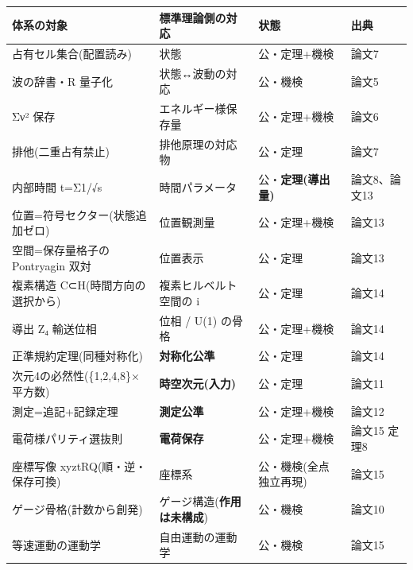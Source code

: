 \documentclass[
]{ltjsarticle}
\newcounter{none} %
\begin{document}
{\def\LTcaptype{none} %
\begin{longtable}[]{@{}
  >{\raggedright\arraybackslash}p{}
  >{\raggedright\arraybackslash}p{}
  >{\raggedright\arraybackslash}p{}
  >{\raggedright\arraybackslash}p{}@{}}
\toprule\noalign{}
\begin{minipage}[b]{\linewidth}\raggedright
体系の対象
\end{minipage} & \begin{minipage}[b]{\linewidth}\raggedright
標準理論側の対応
\end{minipage} & \begin{minipage}[b]{\linewidth}\raggedright
状態
\end{minipage} & \begin{minipage}[b]{\linewidth}\raggedright
出典
\end{minipage} \\
\midrule\noalign{}
\endhead
\bottomrule\noalign{}
\endlastfoot
占有セル集合(配置読み) & 状態 & 公・定理+機検 & 論文7 \\
波の辞書・R 量子化 & 状態↔波動の対応 & 公・機検 & 論文5 \\
Σν² 保存 & エネルギー様保存量 & 公・定理+機検 & 論文6 \\
排他(二重占有禁止) & 排他原理の対応物 & 公・定理 & 論文7 \\
内部時間 t=Σ1/√s & 時間パラメータ & 公・\textbf{定理(導出量)} &
論文8、論文13 \\
位置=符号セクター(状態追加ゼロ) & 位置観測量 & 公・定理+機検 & 論文13 \\
空間=保存量格子の Pontryagin 双対 & 位置表示 & 公・定理 & 論文13 \\
複素構造 C⊂H(時間方向の選択から) & 複素ヒルベルト空間の i & 公・定理 &
論文14 \\
導出 Z₄ 輸送位相 & 位相 / U(1) の骨格 & 公・定理+機検 & 論文14 \\
正準規約定理(同種対称化) & \textbf{対称化公準} & 公・定理 & 論文14 \\
次元4の必然性(\{1,2,4,8\}×平方数) & \textbf{時空次元(入力)} & 公・定理 &
論文11 \\
測定=追記+記録定理 & \textbf{測定公準} & 公・定理+機検 & 論文12 \\
電荷様パリティ選抜則 & \textbf{電荷保存} & 公・定理+機検 & 論文15
定理8 \\
座標写像 xyztRQ(順・逆・保存可換) & 座標系 & 公・機検(全点独立再現) &
論文15 \\
ゲージ骨格(計数から創発) & ゲージ構造(\textbf{作用は未構成}) & 公・機検
& 論文10 \\
等速運動の運動学 & 自由運動の運動学 & 公・機検 & 論文15 \\
\end{longtable}
}
\end{document}
